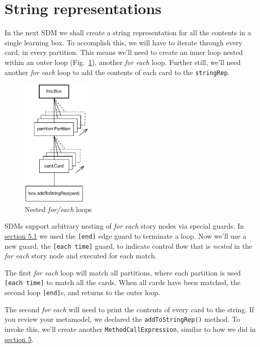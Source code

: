 \newpage
\hypertarget{sec:stringRep}{}
\section{String representations}
\genHeader

In the next SDM we shall create a string representation for all the contents in a single learning box. To accomplish this, we will have to iterate through 
every card, in every partition. This means we'll need to create an inner loop nested within an outer loop (Fig.~\ref{fig:goal_stringRep}), another
\emph{for each} loop. Further still, we'll need another \emph{for each} loop to add the contents of each card to the \texttt{stringRep}.

\begin{figure}[htbp]
	\centering
	\includegraphics[width=0.3\textwidth]{goal_stringRep.pdf}
	\caption{Nested \emph{for/each} loops}
	\label{fig:goal_stringRep}
\end{figure}
\FloatBarrier

SDMs support arbitrary nesting of \emph{for each} story nodes via special guards. In \hyperlink{emptyPartition vis}{section 5.1} we used the \texttt{[end]} edge
guard to terminate a loop. Now we'll use a new guard, the \texttt{[each time]} guard, to indicate control flow that is \emph{nested} in
the \emph{for each} story node and executed for each match.

The first \emph{for each} loop will match all partitions, where each partition is used \texttt{[each time]} to match all the cards.  When 
all cards have been matched, the second loop \texttt{[end]}s, and returns to the outer loop.

The second \emph{for each} will need to print the contents of every card to the string. If you review your metamodel, we declared the \texttt{addToStringRep()}
method. To invoke this, we'll create another \texttt{MethodCallExpression}, similar to how we did in \hyperlink{sec:growBox}{section 5}.


 




